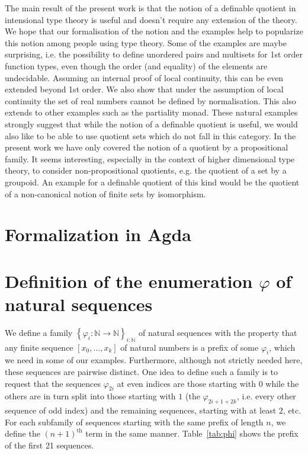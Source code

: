 \documentclass[envcountsame]{llncs}
\newcommand{\N}{\mathbb{N}}
\providecommand{\set}  [1]{\left\{#1\right\}}
\begin{document}
The main result of the present work is that the notion of a definable
quotient in intensional type theory is useful and doesn't require any
extension of the theory. We hope that our formalisation of the notion
and the examples help to popularize this notion among people using
type theory. Some of the examples are maybe surprising, i.e. the
possibility to define unordered pairs and multisets for 1st order
function types, even though the order (and equality) of the elements
are undecidable. Assuming an internal proof of local continuity, this
can be even extended beyond 1st order. We also show that under the
assumption of local continuity the set of real numbers cannot be
defined by normalisation. This also extends to other examples such as
the partiality monad. These natural examples strongly suggest that
while the notion of a definable quotient is useful, we would also like
to be able to use quotient sets which do not fall in this category.
In the present work we have only covered the notion of a quotient by a
propositional family. It seems interesting, especially in the
context of higher dimensional type theory, to consider
non-propositional quotients, e.g. the quotient of a set by a
groupoid. An example for a definable quotient of this kind would be
the quotient of a non-canonical notion of finite sets by isomorphism.




\appendix

\section{Formalization in Agda}\label{app:agda:quotients}



\section{Definition of the enumeration $\varphi$ of natural sequences}\label{app:haskell:phi}
We define a family $\set{\varphi_i:\N\to\N}_{i:\N}$ of natural sequences with the property that any finite sequence $[x_0,\dots,x_k]$ of natural numbers is a prefix of some $\varphi_i$, which we need in some of our examples. Furthermore, although not strictly needed here, these sequences are pairwise distinct. One idea to define such a family is to request that the sequences $\varphi_{2i}$ at even indices are those starting with $0$ while the others are in turn split into  those starting with $1$ (the $\varphi_{2i+1+2k}$, i.e. every other sequence of odd index) and the remaining sequences, starting with at least $2$, etc. For each subfamily of sequences starting with the same prefix of length $n$, we define the $(n+1)^{\text{th}}$ term in the same manner.
Table~\ref{tab:phi} shows the prefix of the first 21 sequences.
\end{document}
